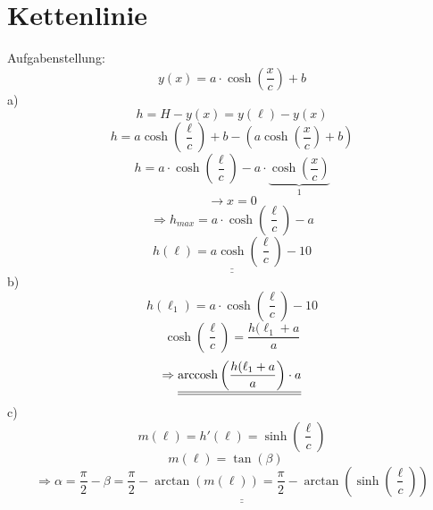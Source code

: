 \section{Kettenlinie}
Aufgabenstellung: 
\[y(x) = a \cdot \cosh\left(\frac{x}{c}\right) + b\]
a)\\
\[h = H - y(x) = y(\ell) - y(x)\]
\[h = a \cosh\left(\frac{\ell}{c}\right) + b - \left(a \cosh\left(\frac{x}{c}\right) + b\right)\]
\[h = a \cdot \cosh\left(\frac{\ell}{c}\right) - a \cdot \underbrace{\cosh\left(\frac{x}{c}\right)}_1\]
\[\rightarrow x = 0\]
\[\Rightarrow h_{max} = a \cdot \cosh\left(\frac{\ell}{c}\right)-a\]
\[\underline{\underline{h(\ell) = a \cosh\left(\frac{\ell}{c}\right) - 10}}\]
b)
\[h(\ell_1) =a \cdot \cosh\left(\frac{\ell}{c}\right) - 10\]
\[\cosh\left(\frac{\ell}{c}\right) = \frac{h(\ell_1 + a}{a}\]
\[\Rightarrow \underline{\underline{\operatorname{arccosh}\left(\frac{h(\ell_1 + a}{a}\right) \cdot a}}\]
c)
\[m(\ell) = h'(\ell) = \sinh\left(\frac{\ell}{c}\right)\]
\[m(\ell) = \tan(\beta) \quad\]
\[\Rightarrow \underline{\underline{\alpha = \frac{\pi}{2} - \beta = \frac{\pi}{2} - \arctan(m(\ell)) = \frac{\pi}{2} - \arctan(\sinh\left(\frac{\ell}{c}\right))}}\]
